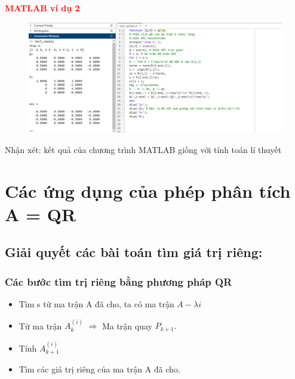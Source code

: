 \textbf{\textcolor{red}{MATLAB ví dụ 2}}\\
\begin{figure}[!ht]
	\centering
	\includegraphics[scale=0.27]{code2}
\end{figure}
Nhận xét: kết quả của chương trình MATLAB giống với tính toán lí thuyết

\newpage 
\section{Các ứng dụng của phép phân tích A = QR}
\subsection{Giải quyết các bài toán tìm giá trị riêng:}
\subsubsection{Các bước tìm trị riêng bằng phương pháp QR }
\begin{itemize}
	\item Tìm s từ ma trận A đã cho, ta có ma trận $A-\lambda i$ 
	\item Từ ma trận $A_k^{(i)}$ $\Rightarrow$ Ma trận quay $P_{k + 1}.$
	\item Tính $A_{k+1}^{(i)}$
	\item Tìm các giá trị riêng của ma trận A đã cho.
\end{itemize}
